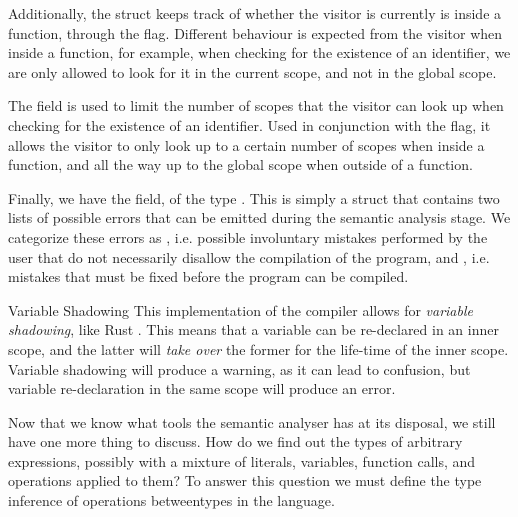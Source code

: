 Additionally, the  struct keeps track of whether the
visitor is currently is inside a function, through the 
flag. Different behaviour is expected from the visitor when inside a function,
for example, when checking for the existence of an identifier, we are only
allowed to look for it in the current scope, and not in the global scope.

The  field is used to limit the number of scopes that
the visitor can look up when checking for the existence of an identifier. Used
in conjunction with the  flag, it allows the visitor to
only look up to a certain number of scopes when inside a function, and all the
way up to the global scope when outside of a function.

Finally, we have the  field, of the type .
This is simply a struct that contains two lists of possible errors that can be
emitted during the semantic analysis stage. We categorize these errors as
, i.e. possible involuntary mistakes performed by the user that
do not necessarily disallow the compilation of the program, and ,
i.e. mistakes that must be fixed before the program can be compiled.

\begin{warningbox}{Variable Shadowing}
    This implementation of the  compiler allows for \textit{variable
        shadowing}, like Rust \cite{rustlangScopeShadowing}.  This means that a variable
    can be re-declared in an inner scope, and the latter will \textit{take over}
    the former for the life-time of the inner scope. Variable shadowing will
    produce a warning, as it can lead to confusion, but variable re-declaration
    in the same scope will produce an error.
\end{warningbox}

Now that we know what tools the semantic analyser has at its disposal, we still
have one more thing to discuss. How do we find out the types of arbitrary
expressions, possibly with a mixture of literals, variables, function calls, and
operations applied to them? To answer this question we must define the type inference of operations betweentypes in the language.

